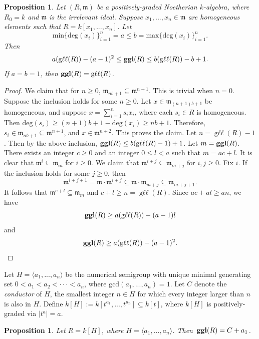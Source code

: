 \documentclass{amsart}
\newtheorem{proposition}[theorem]{Proposition}
\theoremstyle{definition}
\theoremstyle{definition}
\DeclareMathOperator{\gll}{\text{g}\ell\ell}
\DeclareMathOperator{\ggl}{\bf{ggl}}
\numberwithin{equation}{section}
\theoremstyle{definition}
\begin{document}
{\begin{proposition} Let $(R,\mathfrak{m})$ be a positively-graded Noetherian $k$-algebra, where $R_{0}=k$ and $\mathfrak{m}$ is the irrelevant ideal. Suppose $x_{1},...,x_{n} \in \mathfrak{m}$ are homogeneous elements such that $R=k[x_{1},...,x_{n}]$. Let 
\[
\text{min}\{\text{deg}(x_{i})\}_{i=1}^{n}=a \leq b = \text{max}\{\text{deg}(x_{i})\}_{i=1}^{n}.
\]
Then 
\[
a(\gll(R))-(a-1)^2 \leq  \ggl(R) \leq b(\gll(R))-b+1.
\]
\text{}\newline  
If $a=b=1$, then $\ggl(R)=\gll(R)$.
\end{proposition} 
\begin{proof} We claim that for $n \geq 0$, 
$\mathfrak{m}_{nb+1} \subseteq \mathfrak{m}^{n+1}$. 
This is trivial when $n=0$. Suppose the inclusion holds for some $n \geq 0$. Let $x \in \mathfrak{m}_{(n+1)b+1}$ be homogeneous, and suppose $x=\sum\limits_{i=1}^{n}s_{i}x_{i}$, where each $s_{i} \in R$ is homogeneous. Then $\text{deg}(s_{i}) \geq (n+1)b+1-\text{deg}(x_{i}) \geq nb+1.$ Therefore, $s_{i} \in \mathfrak{m}_{nb+1} \subseteq \mathfrak{m}^{n+1}$, and $x \in \mathfrak{m}^{n+2}$. This proves the claim. Let $n=\gll(R)-1$. Then by the above inclusion, $\ggl(R) \leq b(\gll(R)-1)+1$. \newline\newline 
Let $m=\ggl(R)$. There exists an integer $c\geq 0$ and an integer $0 \leq l < a$ such that $m=ac+l$. It is clear that $\mathfrak{m}^{i} \subseteq \mathfrak{m}_{ia}$ for $i \geq 0$. We claim that $\mathfrak{m}^{i+j} \subseteq \mathfrak{m}_{ia+j}$ for $i,j \geq 0$. Fix $i$. If the inclusion holds for some $j \geq 0$, then 
\[
\mathfrak{m}^{i+j+1}=\mathfrak{m} \cdot \mathfrak{m}^{i+j} \subseteq \mathfrak{m} \cdot \mathfrak{m}_{ia+j} \subseteq \mathfrak{m}_{ia+j+1}.
\] 
It follows that $\mathfrak{m}^{c+l} \subseteq \mathfrak{m}_{m}$ and $c+l \geq n=\gll(R)$. Since $ac+al \geq an$, we have 
\[
\ggl(R) \geq a(\gll(R))-(a-1)l
\]
and
\[
\ggl(R) \geq a(\gll(R))-(a-1)^2.
\]\end{proof}\text{}\newline
Let $H=\langle a_1,...,a_n \rangle$ be the numerical semigroup with unique minimal generating set $0<a_1<a_2<\cdot\cdot\cdot <a_n$, where $\text{gcd}(a_1,...,a_n)=1$. Let $C$ denote the {\it{conductor}} of $H$, the smallest integer $n \in H$ for which every integer larger than $n$ is also in $H$. Define $k[H]:=k[t^{a_1},...,t^{a_n}] \subseteq k[t]$, where $k[H]$ is positively-graded via $|t^a|=a$.
\newline
\begin{proposition} Let $R=k[H]$, where $H=\langle a_1,...,a_n \rangle$. Then \,$\ggl(R) = C+a_{1}$.\text{} \end{proposition}
}
\end{document}
